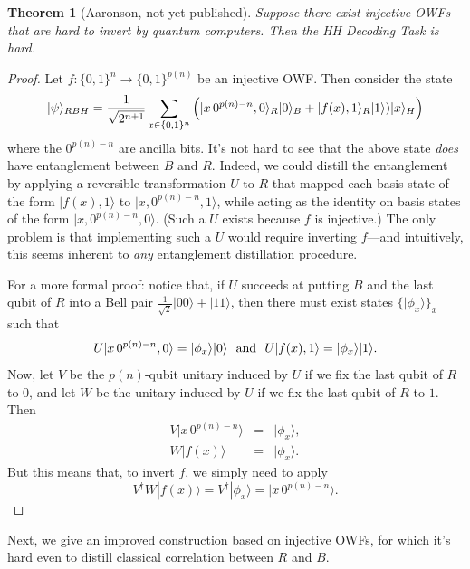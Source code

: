 \documentclass[11pt]{report}
\theoremstyle{plain}
\newtheorem{theorem}{Theorem}[section]
\theoremstyle{definition}
\renewcommand{\ket}[1]{|#1\rangle}
\begin{document}
\begin{theorem}[Aaronson, not yet published]
\label{aarfirewall}
Suppose there exist injective OWFs that are hard to invert by quantum computers.  Then the HH Decoding Task is hard.
\end{theorem}
\begin{proof}
Let $f:\{0,1\}^n\longrightarrow \{0,1\}^{p(n)}$ be an injective OWF.  Then consider the state
$$
\ket{\psi}_{RBH} = {1 \over \sqrt{2^{n+1}}} \sum_{x\in\{0,1\}^n}  \left( \ket{x \, 0^{p(n)-n},0}_R \ket{0}_B + \ket{f(x),1}_R \ket{1} ) \ket{x}_H \right)
$$
where the $0^{p(n) -n}$ are ancilla bits.  It's not hard to see that the above state {\em does} have entanglement between $B$ and $R$.  Indeed, we could distill
the entanglement by applying a reversible transformation $U$ to $R$ that mapped each basis state of the form $\ket{f(x),1}$ to $\ket{x,0^{p(n)-n},1}$, while acting as the identity on basis states of the form $\ket{x,0^{p(n)-n},0}$.  (Such a $U$ exists because $f$ is injective.)  The only problem is that implementing such a $U$
would require inverting $f$---and intuitively, this seems inherent to {\em any} entanglement distillation procedure.

For a more formal proof: notice that, if $U$ succeeds at putting $B$ and the last qubit of $R$ into a Bell pair $\frac{1}{\sqrt{2}}{\ket{00}+\ket{11}}$, then there must exist states $\{ \ket{\phi_x} \}_x$ such that
$$ U \ket{x \, 0^{p(n) -n }, 0} = \ket{\phi_x} \ket{0} \ \ {\rm and } \ \ U\ket{f(x),1} = \ket{\phi_x} \ket{1}. $$
Now, let $V$ be the $p(n)$-qubit unitary induced by $U$ if we fix the last qubit of $R$ to 0, and let $W$ be the unitary induced by $U$ if we fix the last qubit of $R$ to $1$.  Then
\begin{eqnarray}
V \ket{x \, 0^{p(n) -n}} &=& \ket{\phi_x}, \\
W \ket{f(x)} &=& \ket{\phi_x}.
\end{eqnarray}
But this means that, to invert $f$, we simply need to apply
\begin{equation}
V^\dagger W \ket{f(x)} = V^\dagger \ket{\phi_x} = \ket{x \, 0^{p(n) - n}}.
\end{equation}
\end{proof}

Next, we give an improved construction based on injective OWFs, for which it's hard even to distill classical correlation between $R$ and $B$.
\end{document}
